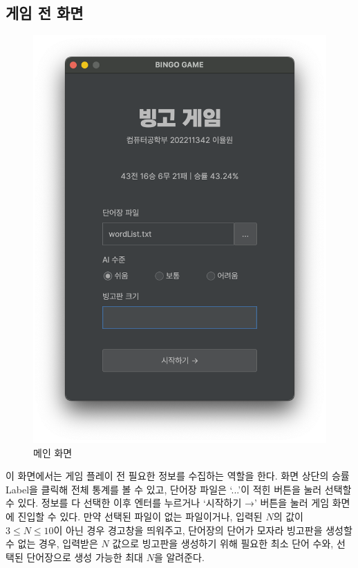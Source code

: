 \subsection{게임 전 화면}
\begin{figure}[h]
    \centering
    \includegraphics[scale=0.5]{img/main.png}
    \caption{메인 화면}
\end{figure}
이 화면에서는 게임 플레이 전 필요한 정보를 수집하는 역할을 한다.
화면 상단의 승률 Label을 클릭해 전체 통계를 볼 수 있고, 단어장 파일은 `...'이 적힌 버튼을 눌러 선택할 수 있다.
정보를 다 선택한 이후 엔터를 누르거나 `시작하기 →' 버튼을 눌러 게임 화면에 진입할 수 있다.
만약 선택된 파일이 없는 파일이거나, 입력된 $N$의 값이 $3 \leq N \leq 10$이 아닌 경우 경고창을 띄워주고,
단어장의 단어가 모자라 빙고판을 생성할 수 없는 경우,
입력받은 $N$ 값으로 빙고판을 생성하기 위해 필요한 최소 단어 수와, 선택된 단어장으로 생성 가능한 최대 $N$을 알려준다.
\newpage

